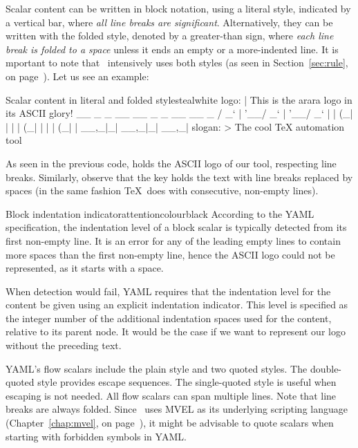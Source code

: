 Scalar content can be written in block notation, using a literal style, indicated by a vertical bar, where \emph{all line breaks are significant}. Alternatively, they can be written with the folded style, denoted by a greater-than sign, where \emph{each line break is folded to a space} unless it ends an empty or a more-indented line. It is mportant to note that \arara\ intensively uses both styles (as seen in Section~\ref{sec:rule}, on page~\pageref{sec:rule}). Let us see an example:

\begin{codebox}{Scalar content in literal and folded styles}{teal}{\icnote}{white}
logo: |
  This is the arara logo
  in its ASCII glory! 
    __ _ _ __ __ _ _ __ __ _ 
   / _` | '__/ _` | '__/ _` |
  | (_| | | | (_| | | | (_| |
   \__,_|_|  \__,_|_|  \__,_|
slogan: >
  The cool TeX
  automation tool
\end{codebox}

As seen in the previous code,  holds the ASCII logo of our tool, respecting line breaks. Similarly, observe that the  key holds the text with line breaks replaced by spaces (in the same fashion \TeX\ does with consecutive, non-empty lines).

\begin{messagebox}{Block indentation indicator}{attentioncolour}{\icattention}{black}
\setlength{\parskip}{1em}
According to the YAML specification, the indentation level of a block scalar is typically detected from its first non-empty line. It is an error for any of the leading empty lines to contain more spaces than the first non-empty line, hence the ASCII logo could not be represented, as it starts with a space.

When detection would fail, YAML requires that the indentation level for the content be given using an explicit indentation indicator. This level is specified as the integer number of the additional indentation spaces used for the content, relative to its parent node. It would be the case if we want to represent our logo without the preceding text.
\end{messagebox}

YAML's flow scalars include the plain style and two quoted styles. The double-quoted style provides escape sequences. The single-quoted style is useful when escaping is not needed. All flow scalars can span multiple lines. Note that line breaks are always folded. Since \arara\ uses MVEL as its underlying scripting language (Chapter~\ref{chap:mvel}, on page~\pageref{chap:mvel}), it might be advisable to quote scalars when starting with forbidden symbols in YAML.

